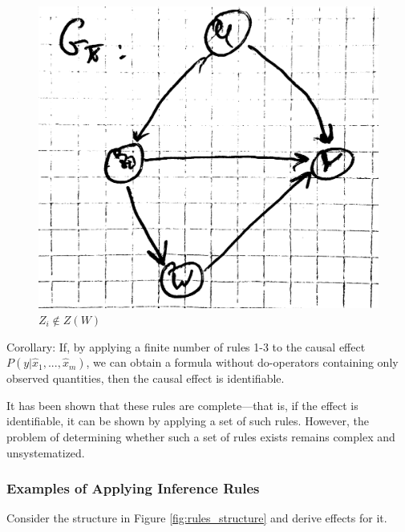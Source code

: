 \documentclass[fleqn]{article}
\numberwithin{equation}{section}
\numberwithin{theorem}{section}
\numberwithin{figure}{section}
\numberwithin{lemma}{section}
\numberwithin{corollary}{section}
\begin{document}
\begin{figure}[h!]
	\begin{center}
		\includegraphics[scale=0.1]{imgs/img22.png}
	\end{center}
	\caption{$Z_i \notin Z(W)$}
	\label{fig:rule3_2}
\end{figure}

Corollary: If, by applying a finite number of rules 1-3 to the causal effect $P(y|\hat x_1,...,\hat x_m)$, we can obtain a formula without do-operators containing only observed quantities, then the causal effect is identifiable.

It has been shown that these rules are complete—that is, if the effect is identifiable, it can be shown by applying a set of such rules. However, the problem of determining whether such a set of rules exists remains complex and unsystematized.

\subsubsection*{Examples of Applying Inference Rules}

Consider the structure in Figure \ref{fig:rules_structure} and derive effects for it.
\end{document}

